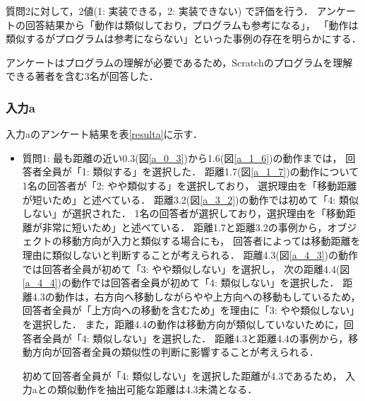 \documentclass[11pt]{jreport}
\begin{document}
質問2に対して，2値(1: 実装できる，2: 実装できない) で評価を行う．
アンケートの回答結果から「動作は類似しており，プログラムも参考になる」，
「動作は類似するがプログラムは参考にならない」といった事例の存在を明らかにする．

アンケートはプログラムの理解が必要であるため，Scratchのプログラムを理解できる著者を含む3名が回答した．

\subsubsection{入力a}
入力aのアンケート結果を表\ref{resulta}に示す．

\begin{itemize}
    \item 質問1: 最も距離の近い0.3(図\ref{a_0_3})から1.6(図\ref{a_1_6})の動作までは，
    回答者全員が「1: 類似する」を選択した．
    距離1.7(図\ref{a_1_7})の動作について1名の回答者が「2: やや類似する」を選択しており，
    選択理由を「移動距離が短いため」と述べている．
    距離3.2(図\ref{a_3_2})の動作では初めて「4: 類似しない」が選択された．
    1名の回答者が選択しており，選択理由を「移動距離が非常に短いため」と述べている．
    距離1.7と距離3.2の事例から，オブジェクトの移動方向が入力と類似する場合にも，
    回答者によっては移動距離を理由に類似しないと判断することが考えられる．
    距離4.3(図\ref{a_4_3})の動作では回答者全員が初めて「3: やや類似しない」を選択し，
    次の距離4.4(図\ref{a_4_4})の動作では回答者全員が初めて「4: 類似しない」を選択した．
    距離4.3の動作は，右方向へ移動しながらやや上方向への移動もしているため，
    回答者全員が「上方向への移動を含むため」を理由に「3: やや類似しない」を選択した．
    また，距離4.4の動作は移動方向が類似していないために，回答者全員が「4: 類似しない」を選択した．
    距離4.3と距離4.4の事例から，移動方向が回答者全員の類似性の判断に影響することが考えられる．
    
    初めて回答者全員が「4: 類似しない」を選択した距離が4.3であるため，
    入力aとの類似動作を抽出可能な距離は4.3未満となる．
    

\end{itemize}
\end{document}
